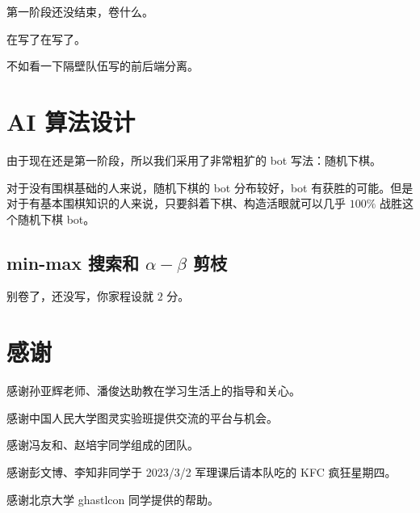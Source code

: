 \documentclass{noithesis}
\begin{document}
	第一阶段还没结束，卷什么。
	
	在写了在写了。
	
	不如看一下隔壁队伍写的前后端分离。
	
	\section{AI 算法设计}
	
	由于现在还是第一阶段，所以我们采用了非常粗犷的 bot 写法：随机下棋。
	
	对于没有围棋基础的人来说，随机下棋的 bot 分布较好，bot 有获胜的可能。但是对于有基本围棋知识的人来说，只要斜着下棋、构造活眼就可以几乎 $100\%$ 战胜这个随机下棋 bot。
	
	\subsection{min-max 搜索和 $\alpha-\beta$ 剪枝}
	
	别卷了，还没写，你家程设就 $2$ 分。
	
	\section{感谢}
	
	感谢孙亚辉老师、潘俊达助教在学习生活上的指导和关心。
	
	感谢中国人民大学图灵实验班提供交流的平台与机会。
	
	感谢冯友和、赵培宇同学组成的团队。
	
	感谢彭文博、李知非同学于 2023/3/2 军理课后请本队吃的 KFC 疯狂星期四。
	
	感谢北京大学 ghastlcon 同学提供的帮助。
	
\end{document}
